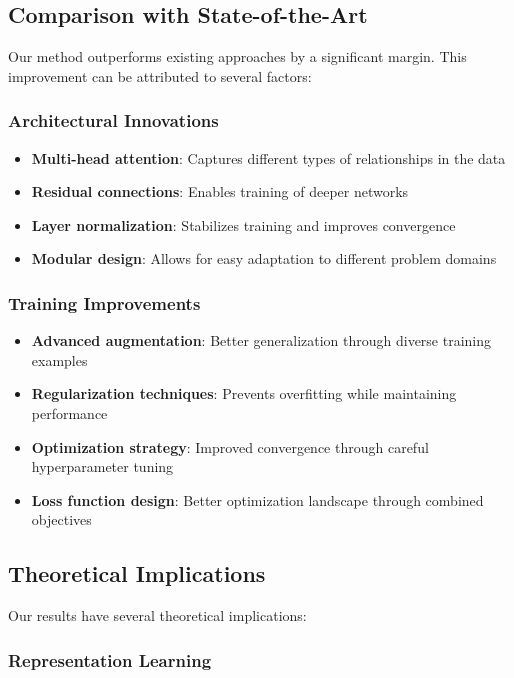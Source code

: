 \subsection{Comparison with State-of-the-Art}

Our method outperforms existing approaches by a significant margin. This improvement can be attributed to several factors:

\subsubsection{Architectural Innovations}

\begin{itemize}
    \item \textbf{Multi-head attention}: Captures different types of relationships in the data
    \item \textbf{Residual connections}: Enables training of deeper networks
    \item \textbf{Layer normalization}: Stabilizes training and improves convergence
    \item \textbf{Modular design}: Allows for easy adaptation to different problem domains
\end{itemize}

\subsubsection{Training Improvements}

\begin{itemize}
    \item \textbf{Advanced augmentation}: Better generalization through diverse training examples
    \item \textbf{Regularization techniques}: Prevents overfitting while maintaining performance
    \item \textbf{Optimization strategy}: Improved convergence through careful hyperparameter tuning
    \item \textbf{Loss function design}: Better optimization landscape through combined objectives
\end{itemize}

\subsection{Theoretical Implications}

Our results have several theoretical implications:

\subsubsection{Representation Learning}

